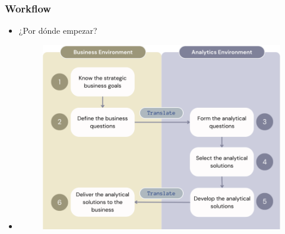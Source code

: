 \begin{frame}
    \frametitle{Workflow}
    \begin{itemize}
        \item<1-> ¿Por dónde empezar?
        \item<2->[]
            \begin{figure}[h!]
            \centering
                \includegraphics[scale=0.3]{Imagenes/01_Translation.png}
            \label{fig:fig1}
            \end{figure}  
    \end{itemize}
\end{frame}